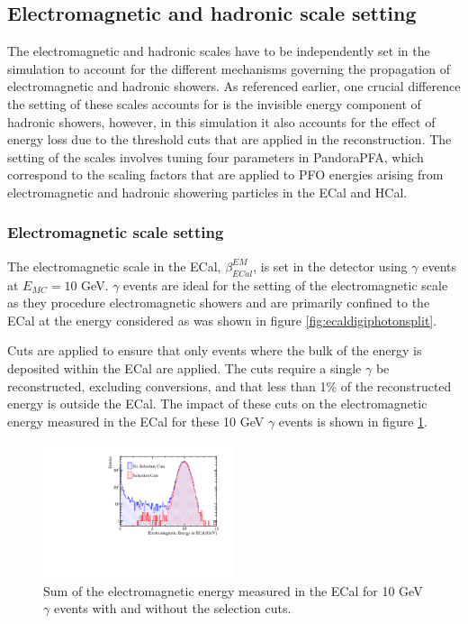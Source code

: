 \subsection{Electromagnetic and hadronic scale setting}
\label{sec:scalesetting}
The electromagnetic and hadronic scales have to be independently set in the simulation to account for the different mechanisms governing the propagation of electromagnetic and hadronic showers.  As referenced earlier, one crucial difference the setting of these scales accounts for is the invisible energy component of hadronic showers, however, in this simulation it also accounts for the effect of energy loss due to the threshold cuts that are applied in the reconstruction.  The setting of the scales involves tuning four parameters in PandoraPFA, which correspond to the scaling factors that are applied to PFO energies arising from electromagnetic and hadronic showering particles in the ECal and HCal.  


\subsubsection{Electromagnetic scale setting}
\label{sec:emscalesetting}
The electromagnetic scale in the ECal, $\beta^{EM}_{ECal}$, is set in the detector using $\gamma$ events at $E_{MC} = 10$ GeV.  $\gamma$ events are ideal for the setting of the electromagnetic scale as they procedure electromagnetic showers and are primarily confined to the ECal at the energy considered as was shown in figure \ref{fig:ecaldigiphotonsplit}.  

Cuts are applied to ensure that only events where the bulk of the energy is deposited within the ECal are applied.  The cuts require a single $\gamma$ be reconstructed, excluding conversions, and that less than 1\% of the reconstructed energy is outside the ECal.  The impact of these cuts on the electromagnetic energy measured in the ECal for these 10 GeV $\gamma$ events is shown in figure \ref{fig:ecalemscaleselection}.

\begin{figure}
\includegraphics[width=0.5\textwidth]{EnergyEstimators/Plots/Calibration/EMScaleSetting/EMScaleECalSelection.pdf}
\caption[Sum of the electromagnetic energy measured in the ECal for 10 GeV $\gamma$ events with and without the selection cuts.]{Sum of the electromagnetic energy measured in the ECal for 10 GeV $\gamma$ events with and without the selection cuts.}
\label{fig:ecalemscaleselection}
\end{figure}

